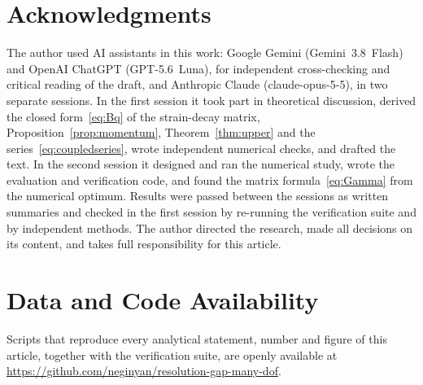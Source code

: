 \section*{Acknowledgments}
The author used AI assistants in this work: Google Gemini (\mbox{Gemini 3.8 Flash}) and OpenAI ChatGPT (\mbox{GPT-5.6 Luna}), for independent cross-checking and critical reading of the draft, and Anthropic Claude (\mbox{claude-opus-5-5}), in two separate sessions. In the first session it took part in theoretical discussion, derived the closed form~\eqref{eq:Bq} of the strain-decay matrix, Proposition~\ref{prop:momentum}, Theorem~\ref{thm:upper} and the series~\eqref{eq:coupledseries}, wrote independent numerical checks, and drafted the text. In the second session it designed and ran the numerical study, wrote the evaluation and verification code, and found the matrix formula~\eqref{eq:Gamma} from the numerical optimum. Results were passed between the sessions as written summaries and checked in the first session by re-running the verification suite and by independent methods. The author directed the research, made all decisions on its content, and takes full responsibility for this article.

\section*{Data and Code Availability}
Scripts that reproduce every analytical statement, number and figure of this article, together with the verification suite, are openly available at \url{https://github.com/neginyan/resolution-gap-many-dof}. 
